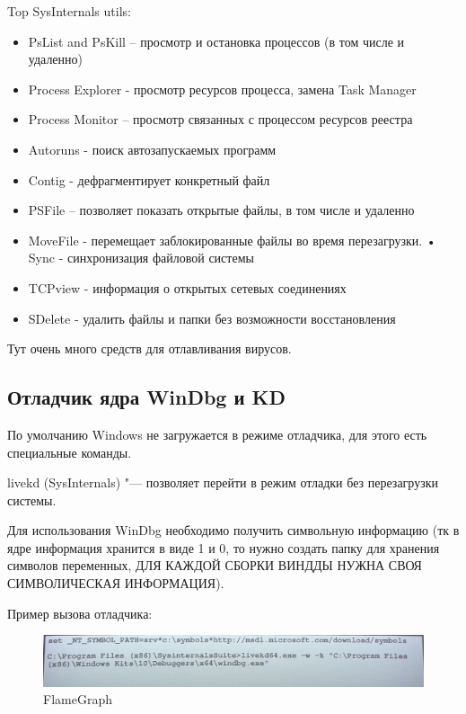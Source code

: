\documentclass[bachelor, och, book]{SCWorks}
\theoremstyle{remark}
\begin{document}
    Top SysInternals utils: 

    \begin{itemize}[label=$\bullet$]
        \item PsList and PsKill -- просмотр и остановка процессов (в том числе и удаленно)
        \item Process Explorer - просмотр ресурсов процесса, замена Task Manager
        \item Process Monitor -- просмотр связанных с процессом ресурсов реестра
        \item Autoruns - поиск автозапускаемых программ
        \item Contig - дефрагментирует конкретный файл
        \item PSFile -- позволяет показать открытые файлы, в том числе и удаленно
        \item MoveFile - перемещает заблокированные файлы во время перезагрузки. • Sync - синхронизация файловой системы
        \item TCPview - информация о открытых сетевых соединениях
        \item SDelete - удалить файлы и папки без возможности восстановления
    \end{itemize}

    Тут очень много средств для отлавливания вирусов.

    \subsection{Отладчик ядра WinDbg и KD}
    По умолчанию Windows не загружается в режиме отладчика, для этого есть специальные команды.

    livekd (SysInternals) "--- позволяет перейти в режим отладки без перезагрузки системы.

    Для использования WinDbg необходимо получить символьную информацию (тк в ядре информация хранится в виде 1 и 0, то нужно создать папку для хранения символов переменных, ДЛЯ КАЖДОЙ СБОРКИ ВИНДДЫ НУЖНА СВОЯ СИМВОЛИЧЕСКАЯ ИНФОРМАЦИЯ).

    Пример вызова отладчика:

    \begin{figure}[H]
        \begin{center}
            \includegraphics[scale=0.4]{res/example-WinDbg.png}
            \caption{FlameGraph}
        \end{center}
    \end{figure}
\end{document}

